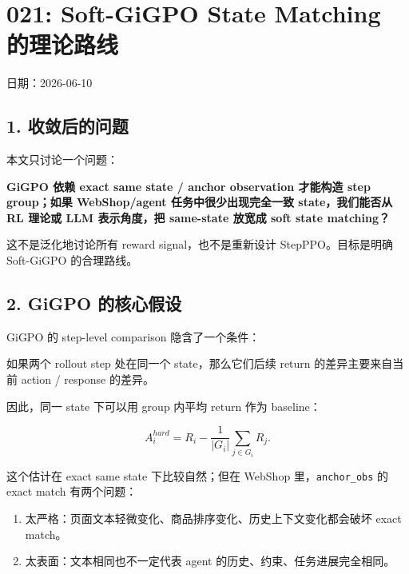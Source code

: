 \documentclass[
  10pt,
]{ctexart}
\author{}
\date{2026-06-10}
\newenvironment{Shaded}{}{}
\newcommand{\NormalTok}[1]{#1}
\providecommand{\tightlist}{%
  \setlength{\itemsep}{0pt}\setlength{\parskip}{0pt}}
\begin{document}
\section{021: Soft-GiGPO State Matching
的理论路线}\label{soft-gigpo-state-matching-ux7684ux7406ux8bbaux8defux7ebf}

日期：2026-06-10

\subsection{1. 收敛后的问题}\label{ux6536ux655bux540eux7684ux95eeux9898}

本文只讨论一个问题：

\textbf{GiGPO 依赖 exact same state / anchor observation 才能构造 step
group；如果 WebShop/agent 任务中很少出现完全一致 state，我们能否从 RL
理论或 LLM 表示角度，把 same-state 放宽成 soft state matching？}

这不是泛化地讨论所有 reward signal，也不是重新设计 StepPPO。目标是明确
Soft-GiGPO 的合理路线。

\subsection{2. GiGPO
的核心假设}\label{gigpo-ux7684ux6838ux5fc3ux5047ux8bbe}

GiGPO 的 step-level comparison 隐含了一个条件：

\begin{Shaded}
\begin{Highlighting}[]
\NormalTok{如果两个 rollout step 处在同一个 state，那么它们后续 return 的差异主要来自当前 action / response 的差异。}
\end{Highlighting}
\end{Shaded}

因此，同一 state 下可以用 group 内平均 return 作为 baseline：

\[
A_i^{hard}=R_i-\frac{1}{|G_i|}\sum_{j\in G_i} R_j .
\]

这个估计在 exact same state 下比较自然；但在 WebShop
里，\texttt{anchor\_obs} 的 exact match 有两个问题：

\begin{enumerate}
\def\labelenumi{\arabic{enumi}.}
\tightlist
\item
  太严格：页面文本轻微变化、商品排序变化、历史上下文变化都会破坏 exact
  match。
\item
  太表面：文本相同也不一定代表 agent 的历史、约束、任务进展完全相同。
\end{enumerate}
\end{document}
